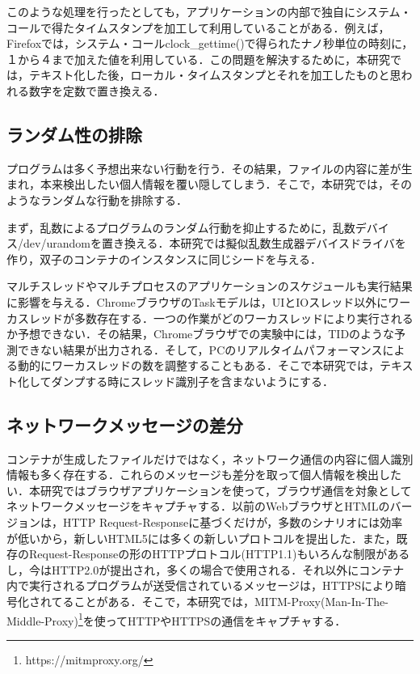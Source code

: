 \documentclass[submit,techrep]{ipsj}
\begin{document}
\begin{itemize}
このような処理を行ったとしても，アプリケーションの内部で独自にシステム・コールで得たタイムスタンプを加工して利用していることがある．例えば，Firefoxでは，システム・コールclock\_gettime()で得られたナノ秒単位の時刻に，１から４まで加えた値を利用している．この問題を解決するために，本研究では，テキスト化した後，ローカル・タイムスタンプとそれを加工したものと思われる数字を定数で置き換える．

\subsection{ランダム性の排除}

プログラムは多く予想出来ない行動を行う．その結果，ファイルの内容に差が生まれ，本来検出したい個人情報を覆い隠してしまう．そこで，本研究では，そのようなランダムな行動を排除する．

まず，乱数によるプログラムのランダム行動を抑止するために，乱数デバイス/dev/urandomを置き換える．本研究では擬似乱数生成器デバイスドライバを作り，双子のコンテナのインスタンスに同じシードを与える．

マルチスレッドやマルチプロセスのアプリケーションのスケジュールも実行結果に影響を与える．ChromeブラウザのTaskモデルは，UIとIOスレッド以外にワーカスレッドが多数存在する．一つの作業がどのワーカスレッドにより実行されるか予想できない．その結果，Chromeブラウザでの実験中には，TIDのような予測できない結果が出力される．そして，PCのリアルタイムパフォーマンスによる動的にワーカスレッドの数を調整することもある\cite{dynamic}．そこで本研究では，テキスト化してダンプする時にスレッド識別子を含まないようにする．

\subsection{ネットワークメッセージの差分}
\label{sec:net}

コンテナが生成したファイルだけではなく，ネットワーク通信の内容に個人識別情報も多く存在する．これらのメッセージも差分を取って個人情報を検出したい．本研究ではブラウザアプリケーションを使って，ブラウザ通信を対象としてネットワークメッセージをキャプチャする．以前のWebブラウザとHTMLのバージョンは，HTTP Request-Responseに基づくだけが，多数のシナリオには効率が低いから，新しいHTML5には多くの新しいプロトコルを提出した．また，既存のRequest-Responseの形のHTTPプロトコル(HTTP1.1)もいろんな制限があるし，今はHTTP2.0が提出され，多くの場合で使用される．それ以外にコンテナ内で実行されるプログラムが送受信されているメッセージは，HTTPSにより暗号化されてることがある．そこで，本研究では，MITM-Proxy(Man-In-The-Middle-Proxy)\footnote{https://mitmproxy.org/}を使ってHTTPやHTTPSの通信をキャプチャする．


\end{itemize}
\end{document}
